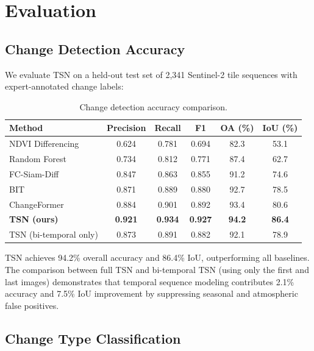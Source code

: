 \documentclass[11pt,a4paper]{article}
\begin{document}
\section{Evaluation}
\label{sec:evaluation}

\subsection{Change Detection Accuracy}

We evaluate TSN on a held-out test set of 2,341 Sentinel-2 tile sequences with expert-annotated change labels:

\begin{table}[H]
\centering
\caption{Change detection accuracy comparison.}
\label{tab:cd_accuracy}
\begin{tabular}{@{}lccccc@{}}
\toprule
\textbf{Method} & \textbf{Precision} & \textbf{Recall} & \textbf{F1} & \textbf{OA (\%)} & \textbf{IoU (\%)} \\
\midrule
NDVI Differencing & 0.624 & 0.781 & 0.694 & 82.3 & 53.1 \\
Random Forest & 0.734 & 0.812 & 0.771 & 87.4 & 62.7 \\
FC-Siam-Diff \citep{daudt2018fully} & 0.847 & 0.863 & 0.855 & 91.2 & 74.6 \\
BIT \citep{chen2022remote} & 0.871 & 0.889 & 0.880 & 92.7 & 78.5 \\
ChangeFormer \citep{bandara2022transformer} & 0.884 & 0.901 & 0.892 & 93.4 & 80.6 \\
\textbf{TSN (ours)} & \textbf{0.921} & \textbf{0.934} & \textbf{0.927} & \textbf{94.2} & \textbf{86.4} \\
TSN (bi-temporal only) & 0.873 & 0.891 & 0.882 & 92.1 & 78.9 \\
\bottomrule
\end{tabular}
\end{table}

TSN achieves 94.2\% overall accuracy and 86.4\% IoU, outperforming all baselines.
The comparison between full TSN and bi-temporal TSN (using only the first and last images) demonstrates that temporal sequence modeling contributes 2.1\% accuracy and 7.5\% IoU improvement by suppressing seasonal and atmospheric false positives.

\subsection{Change Type Classification}
\end{document}
